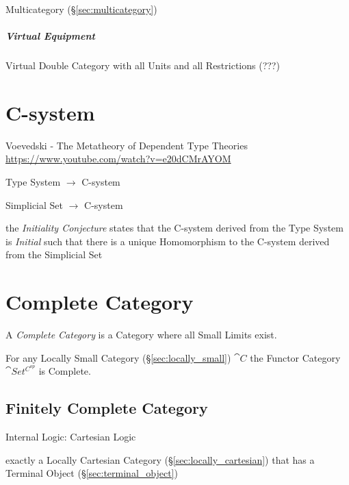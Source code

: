 Multicategory (\S\ref{sec:multicategory})



\subparagraph{Virtual Equipment}\label{sec:virtual_equipment}\hfill

Virtual Double Category with all Units and all Restrictions (???)



\section{C-system}\label{sec:c_system}

Voevedski - The Metatheory of Dependent Type Theories
\url{https://www.youtube.com/watch?v=e20dCMrAYOM}

Type System $\rightarrow$ C-system

Simplicial Set $\rightarrow$ C-system

the \emph{Initiality Conjecture} states that the C-system derived from
the Type System is \emph{Initial} such that there is a unique
Homomorphism to the C-system derived from the Simplicial Set



\section{Complete Category}\label{sec:complete_category}

A \emph{Complete Category} is a Category where all Small Limits exist.

For any Locally Small Category (\S\ref{sec:locally_small})
$\cat{C}$ the Functor Category $\cat{Set^{C^{op}}}$ is Complete.



\subsection{Finitely Complete Category}\label{sec:finitely_complete}

Internal Logic: Cartesian Logic %

exactly a Locally Cartesian Category (\S\ref{sec:locally_cartesian})
that has a Terminal Object (\S\ref{sec:terminal_object})

